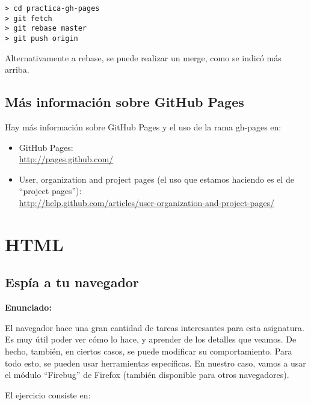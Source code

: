 \begin{verbatim}
> cd practica-gh-pages
> git fetch
> git rebase master
> git push origin
\end{verbatim}

Alternativamente a rebase, se puede realizar un merge, como se indicó más arriba.

\subsection{Más información sobre GitHub Pages}

Hay más información sobre GitHub Pages y  el uso de la rama gh-pages en:

\begin{itemize}
\item GitHub Pages: \\
  \url{http://pages.github.com/}
\item User, organization and project pages (el uso que estamos haciendo es el de ``project pages''): \\
  \url{http://help.github.com/articles/user-organization-and-project-pages/}
\end{itemize}


\section{HTML}

\subsection{Espía a tu navegador}
\label{subsec:eje-firebug}

\textbf{Enunciado:}

El navegador hace una gran cantidad de tareas interesantes para esta asignatura. Es muy útil poder ver cómo lo hace, y aprender de los detalles que veamos. De hecho, también, en ciertos casos, se puede modificar su comportamiento. Para todo esto, se pueden usar herramientas específicas. En nuestro caso, vamos a usar el módulo ``Firebug'' de Firefox (también disponible para otros navegadores).

El ejercicio consiste en:

